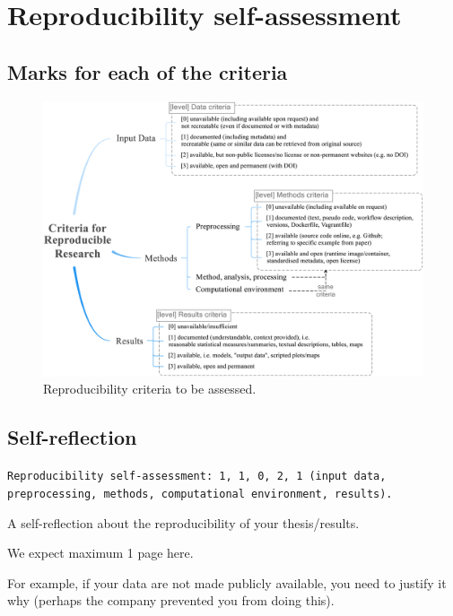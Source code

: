 

\chapter{Reproducibility self-assessment}

\section{Marks for each of the criteria}

\begin{figure}[h]
  \centering
  \includegraphics[width=0.65\linewidth]{figs/reproducibility_criteria.png}
  \caption{Reproducibility criteria to be assessed.}
\label{fig:reproducibility_criteria}
\end{figure}


\section{Self-reflection} 

\texttt{Reproducibility self-assessment: 1, 1, 0, 2, 1 (input data, preprocessing, methods, computational environment, results).}

A self-reflection about the reproducibility of your thesis/results.

We expect maximum 1 page here.

For example, if your data are not made publicly available, you need to justify it why (perhaps the company prevented you from doing this).
